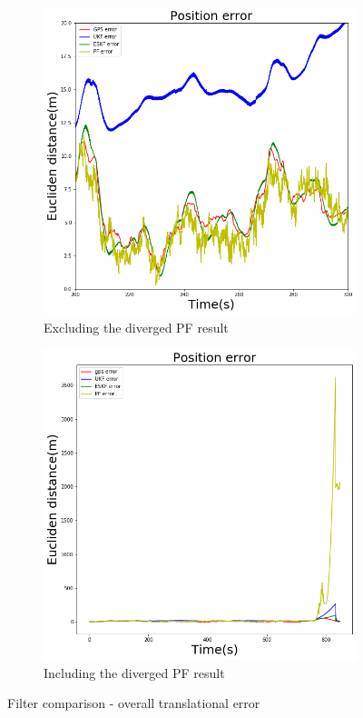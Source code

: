 \begin{figure}[htp]
    \begin{subfigure}{0.5\textwidth}
        \centering
        \includegraphics[width=1\textwidth]{figs/overall.png}
        \caption{Excluding the diverged PF result}
    \end{subfigure}%
    \begin{subfigure}{0.5\textwidth}
        \includegraphics[width=1\textwidth]{figs/overall_diverge.png}
        \caption{Including the diverged PF result}
    \end{subfigure}
    \vspace{-0.4cm}
    \caption{Filter comparison - overall translational error}
    \label{fig:ch:errorPositionOverall}
    \vspace{0.5cm}
\end{figure}


